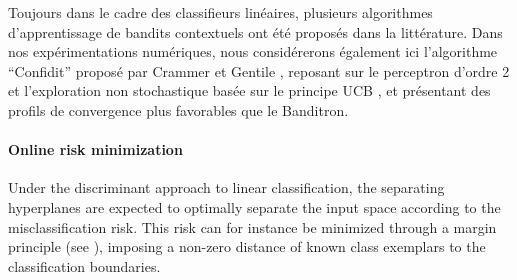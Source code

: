 \documentclass[preprint,12pt,authoryear]{elsarticle}
\begin{document}
{\color{blue}
Toujours dans le cadre des classifieurs linéaires, plusieurs algorithmes d'apprentissage de bandits contextuels ont été proposés dans la littérature. Dans nos expérimentations numériques, nous considérerons également ici l'algorithme ``Confidit'' proposé par Crammer et Gentile \cite{crammer2013multiclass}, reposant sur le perceptron d'ordre 2 et l'exploration non stochastique basée sur le principe UCB \cite{lai1985asymptotically}, et présentant des profils de convergence plus favorables que le Banditron. }


\paragraph{Online risk minimization}
Under the discriminant approach to linear classification, the separating hyperplanes are expected to optimally separate the input space according to the misclassification risk. This risk can for instance be minimized through a margin principle (see \cite{vapnik1998statistical}), imposing a non-zero distance of known class exemplars to the classification boundaries. 
\end{document}
